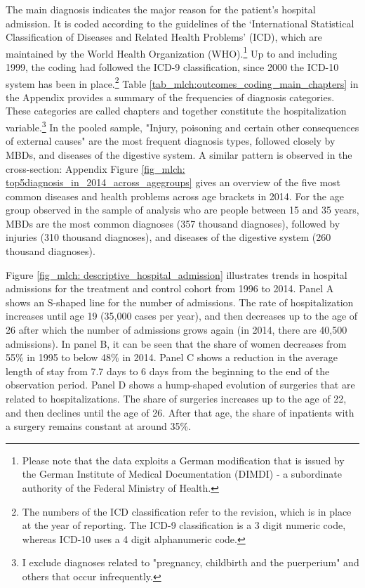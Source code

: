 The main diagnosis indicates the major reason for the patient's hospital admission. It is coded according to the guidelines of the `International Statistical Classification of Diseases and Related Health Problems' (ICD), which are maintained by the World Health Organization (WHO).\footnote{Please note that the data exploits a German modification that is issued by the German Institute of Medical Documentation (DIMDI) - a subordinate authority of the Federal Ministry of Health.} Up to and including 1999, the coding had followed the ICD-9 classification, since 2000 the ICD-10 system has been in place.\footnote{The numbers of the ICD classification refer to the revision, which is in place at the year of reporting. The ICD-9 classification is a 3 digit numeric code, whereas ICD-10 uses a 4 digit alphanumeric code.} Table \ref{tab_mlch:outcomes_coding_main_chapters} in the Appendix provides a summary of the frequencies of diagnosis categories. These categories are called chapters and together constitute the hospitalization variable.\footnote{I exclude diagnoses related to "pregnancy, childbirth and the puerperium" and others that occur infrequently.} In the pooled sample, "Injury, poisoning and certain other consequences of external causes" are the most frequent diagnosis types, followed closely by MBDs, and diseases of the digestive system. A similar pattern is observed in the cross-section: Appendix Figure \ref{fig_mlch: top5diagnosis_in_2014_across_agegroups} gives an overview of the five most common diseases and health problems across age brackets in 2014. For the age group observed in the sample of analysis who are people between 15 and 35 years, MBDs are the most common diagnoses (357 thousand diagnoses), followed by injuries (310 thousand diagnoses), and diseases of the digestive system (260 thousand diagnoses). %


Figure \ref{fig_mlch: descriptive_hospital_admission} illustrates trends in hospital admissions for the treatment and control cohort from 1996 to 2014. Panel A shows an S-shaped line for the number of admissions. The rate of hospitalization increases until age 19 (35,000 cases per year), and then decreases up to the age of 26 after which the number of admissions grows again (in 2014, there are 40,500 admissions). In panel B, it can be seen that the share of women decreases from 55\% in 1995 to below 48\% in 2014. Panel C shows a reduction in the average length of stay from 7.7 days to 6 days from the beginning to the end of the observation period. Panel D shows a hump-shaped evolution of surgeries that are related to hospitalizations. The share of surgeries increases up to the age of 22, and then declines until the age of 26. After that age, the share of inpatients with a surgery remains constant at around 35\%. %



